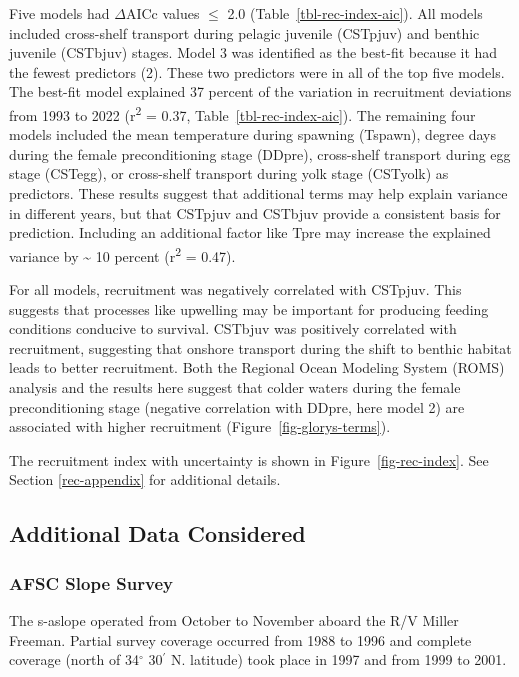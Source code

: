 \documentclass[
  english,
]{article}
\begin{document}
Five models had \(\Delta\)AICc values \(\le\) 2.0
(Table~\ref{tbl-rec-index-aic}). All models included cross-shelf
transport during pelagic juvenile (CSTpjuv) and benthic juvenile
(CSTbjuv) stages. Model 3 was identified as the best-fit because it had
the fewest predictors (2). These two predictors were in all of the top
five models. The best-fit model explained 37 percent of the variation in
recruitment deviations from 1993 to 2022 (r\textsuperscript{2} = 0.37,
Table~\ref{tbl-rec-index-aic}). The remaining four models included the
mean temperature during spawning (Tspawn), degree days during the female
preconditioning stage (DDpre), cross-shelf transport during egg stage
(CSTegg), or cross-shelf transport during yolk stage (CSTyolk) as
predictors. These results suggest that additional terms may help explain
variance in different years, but that CSTpjuv and CSTbjuv provide a
consistent basis for prediction. Including an additional factor like
Tpre may increase the explained variance by \textasciitilde{} 10 percent
(r\textsuperscript{2} = 0.47).

For all models, recruitment was negatively correlated with CSTpjuv. This
suggests that processes like upwelling may be important for producing
feeding conditions conducive to survival. CSTbjuv was positively
correlated with recruitment, suggesting that onshore transport during
the shift to benthic habitat leads to better recruitment. Both the
Regional Ocean Modeling System (ROMS) analysis and the results here
suggest that colder waters during the female preconditioning stage
(negative correlation with DDpre, here model 2) are associated with
higher recruitment (Figure~\ref{fig-glorys-terms}).

The recruitment index with uncertainty is shown in
Figure~\ref{fig-rec-index}. See Section \ref{rec-appendix} for
additional details.

\subsection{Additional Data Considered}\label{data-not-used}

\subsubsection{AFSC Slope Survey}\label{afsc-slope-survey}

The \gls{s-aslope} operated from October to November aboard the R/V
Miller Freeman. Partial survey coverage occurred from 1988 to 1996 and
complete coverage (north of 34\(^\circ\) 30\(^\prime\) N. latitude) took
place in 1997 and from 1999 to 2001.
\end{document}
